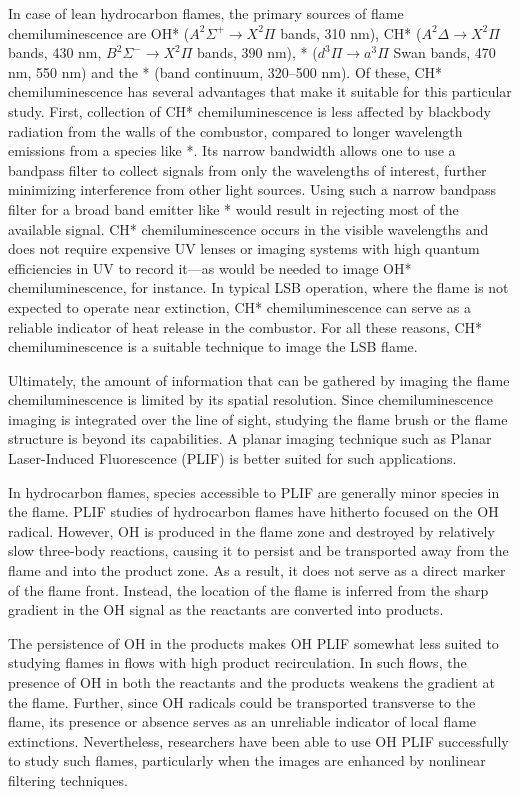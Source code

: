 In case of lean hydrocarbon flames, the primary sources of flame chemiluminescence are OH* (\(A^2\Sigma^+\rightarrow X^2\Pi\) bands, 310 nm), CH* (\(A^2\Delta\rightarrow X^2\Pi\) bands, 430 nm, \(B^2\Sigma^-\rightarrow X^2\Pi\) bands, 390 nm), * (\(d^3\Pi\rightarrow a^3\Pi\) Swan bands, 470 nm, 550 nm) and the * (band continuum, 320--500 nm).
Of these, CH* chemiluminescence has several advantages that make it suitable for this particular study.
First, collection of CH* chemiluminescence is less affected by blackbody radiation from the walls of the combustor, compared to longer wavelength emissions from a species like *.
Its narrow bandwidth allows one to use a bandpass filter to collect signals from only the wavelengths of interest, further minimizing interference from other light sources.
Using such a narrow bandpass filter for a broad band emitter like * would result in rejecting most of the available signal.
CH* chemiluminescence occurs in the visible wavelengths and does not require expensive UV lenses or imaging systems with high quantum efficiencies in UV to record it---as would be needed to image OH* chemiluminescence, for instance.
In typical LSB operation, where the flame is not expected to operate near extinction, CH* chemiluminescence can serve as a reliable indicator of heat release in the combustor.
For all these reasons, CH* chemiluminescence is a suitable technique to image the LSB flame.

Ultimately, the amount of information that can be gathered by imaging the flame chemiluminescence is limited by its spatial resolution.
Since chemiluminescence imaging is integrated over the line of sight, studying the flame brush or the flame structure is beyond its capabilities.
A planar imaging technique such as Planar Laser-Induced Fluorescence (PLIF) is better suited for such applications.

In hydrocarbon flames, species accessible to PLIF are generally minor species in the flame.
PLIF studies of hydrocarbon flames have hitherto focused on the OH radical.
However, OH is produced in the flame zone and destroyed by relatively slow three-body reactions, causing it to persist and be transported away from the flame and into the product zone.\cite{1990-barlow}
As a result, it does not serve as a direct marker of the flame front.
Instead, the location of the flame is inferred from the sharp gradient in the OH signal as the reactants are converted into products.

The persistence of OH in the products makes OH PLIF somewhat less suited to studying flames in flows with high product recirculation.
In such flows, the presence of OH in both the reactants and the products weakens the gradient at the flame.
Further, since OH radicals could be transported transverse to the flame, its presence or absence serves as an unreliable indicator of local flame extinctions.
Nevertheless, researchers have been able to use OH PLIF successfully\cite{1999-kaminski,2005-hult} to study such flames, particularly when the images are enhanced by nonlinear filtering techniques.\cite{2000-malm,2001-abu-gharbieh}

